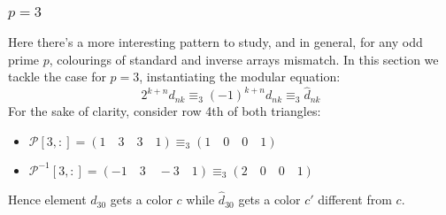 \documentclass[10pt,a4paper]{article} %
\begin{document}
    \subsubsection{$p=3$}
    Here there's a more interesting pattern to study, and in general,
    for any odd prime $p$, colourings of standard and inverse arrays
    mismatch. In this section we tackle the case for $p=3$,
    instantiating the modular equation:
    \begin{displaymath}
      2^{k+n}d_{nk}\equiv_{3}(-1)^{k+n}d_{nk} \equiv_{3} \hat{d}_{nk}
    \end{displaymath}
    For the sake of clarity, consider row 4th of both triangles:
    \begin{itemize}
    \item $\mathcal{P}[3,:] = (1 \quad 3 \quad 3 \quad 1) \equiv_{3}(1 \quad 0 \quad 0 \quad 1)$
    \item $\mathcal{P}^{-1}[3,:] = (-1 \quad 3 \quad -3 \quad 1) \equiv_{3}(2 \quad 0 \quad 0 \quad 1)$
    \end{itemize}
    Hence element $d_{30}$ gets a color $c$ while $\hat{d}_{30}$ gets
    a color $c'$ different from $c$.
\end{document}
